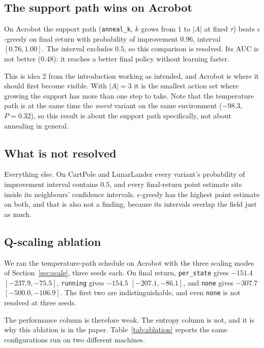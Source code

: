 \documentclass[11pt,a4paper]{article}
\begin{document}
\subsection{The support path wins on Acrobot}
\label{sec:res-support}

On Acrobot the support path (\texttt{anneal\_k}, $k$ grows from $1$ to $|A|$ at
fixed $\tau$) beats $\epsilon$-greedy on final return with probability of
improvement $0.96$, interval $[0.76, 1.00]$. The interval excludes $0.5$, so
this comparison is resolved. Its AUC is not better ($0.48$): it reaches a
better final policy without learning faster.

This is idea 2 from the introduction working as intended, and Acrobot is where
it should first become visible. With $|A| = 3$ it is the smallest action set
where growing the support has more than one step to take. Note that the
temperature path is at the same time the \emph{worst} variant on the same
environment ($-98.3$, $P = 0.32$), so this result is about the support path
specifically, not about annealing in general.

\subsection{What is not resolved}

Everything else. On CartPole and LunarLander every variant's probability of
improvement interval contains $0.5$, and every final-return point estimate sits
inside its neighbours' confidence intervals. $\epsilon$-greedy has the highest
point estimate on both, and that is also not a finding, because its intervals
overlap the field just as much.

\subsection{Q-scaling ablation}
\label{sec:res-ablation}

We ran the temperature-path schedule on Acrobot with the three scaling modes of
Section~\ref{sec:scale}, three seeds each. On final return, \texttt{per\_state}
gives $-151.4$ $[-237.9, -75.5]$, \texttt{running} gives $-154.5$
$[-207.1, -86.1]$, and \texttt{none} gives $-307.7$ $[-500.0, -106.9]$. The
first two are indistinguishable, and even \texttt{none} is not resolved at
three seeds.

The performance column is therefore weak. The entropy column is not, and it is
why this ablation is in the paper. Table~\ref{tab:ablation} reports the same
configurations run on two different machines.
\end{document}
